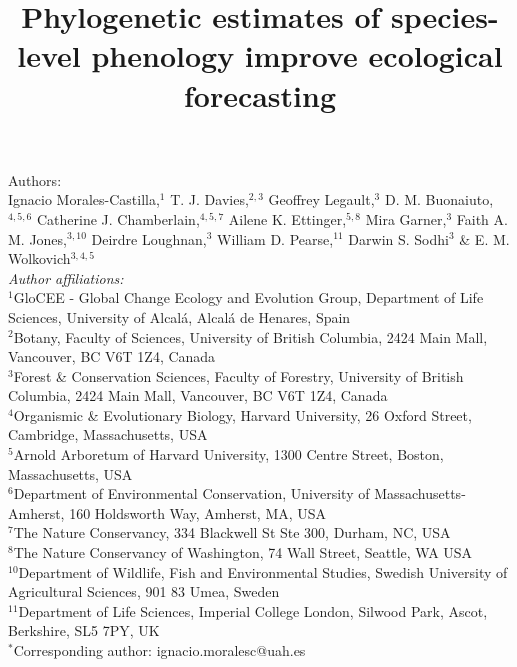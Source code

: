 \documentclass[11pt]{article}
\title{Phylogenetic estimates of species-level phenology improve ecological forecasting}
\def\labelitemi{--}
\begin{document}


\author{}
\maketitle

\noindent Authors:\\
Ignacio Morales-Castilla,$^{1}$ T. J. Davies,$^{2,3}$ Geoffrey Legault,$^{3}$ D. M. Buonaiuto,$^{4,5,6}$ Catherine J. Chamberlain,$^{4,5,7}$ Ailene K. Ettinger,$^{5,8}$ Mira Garner,$^{3}$ Faith A. M. Jones,$^{3,10}$ Deirdre Loughnan,$^{3}$ William D. Pearse,$^{11}$ Darwin S. Sodhi$^{3}$ \& E. M. Wolkovich$^{3,4,5}$  \vspace{2ex}\\
\emph{Author affiliations:}\\
$^{1}$GloCEE - Global Change Ecology and Evolution Group, Department of Life Sciences, University of Alcal\'a, Alcal\'a de Henares, Spain\\ %
 $^{2}$Botany, Faculty of Sciences, University of British Columbia, 2424 Main Mall, Vancouver, BC V6T 1Z4, Canada\\
$^{3}$Forest \& Conservation Sciences, Faculty of Forestry, University of British Columbia, 2424 Main Mall, Vancouver, BC V6T 1Z4, Canada\\
$^{4}$Organismic \& Evolutionary Biology, Harvard University, 26 Oxford Street, Cambridge, Massachusetts, USA\\
$^{5}$Arnold Arboretum of Harvard University, 1300 Centre Street, Boston, Massachusetts, USA\\
$^{6}$Department of Environmental Conservation, University of Massachusetts-Amherst, 160 Holdsworth Way, Amherst, MA, USA\\  %
 $^{7}$The Nature Conservancy, 334 Blackwell St Ste 300, Durham, NC, USA \\ %
$^{8}$The Nature Conservancy of Washington, 74 Wall Street, Seattle, WA  USA \\ %
$^{10}$Department of Wildlife, Fish and Environmental Studies, Swedish University of Agricultural Sciences, 901 83 Umea, Sweden\\ %
$^{11}$Department of Life Sciences, Imperial College London, Silwood Park, Ascot, Berkshire, SL5 7PY, UK\\

\vspace{2ex}
$^*$Corresponding author: ignacio.moralesc@uah.es\\
\renewcommand{\thetable}{\arabic{table}}
\renewcommand{\thefigure}{\arabic{figure}}
\renewcommand{\labelitemi}{$-$}
\end{document}
